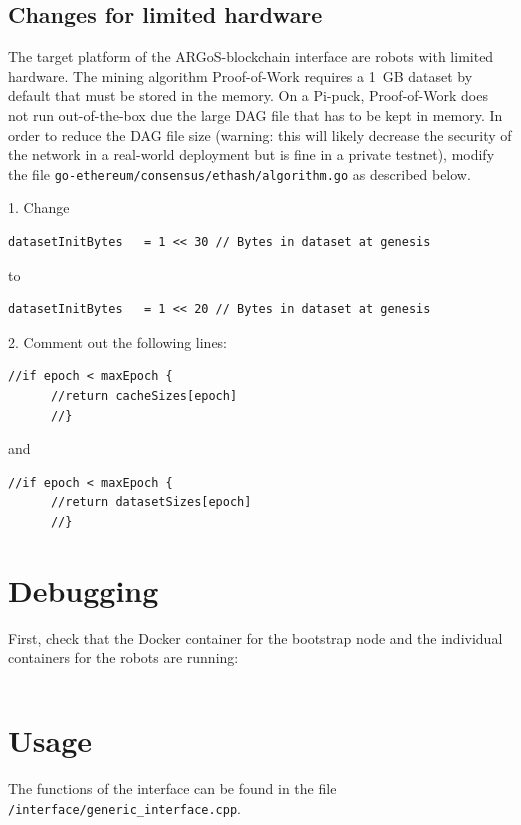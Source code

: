 \documentclass{article}
\begin{document}
\subsection{Changes for limited hardware}
\label{sec:limited-hardware}

The target platform of the ARGoS-blockchain interface are robots with
limited hardware. The mining algorithm Proof-of-Work requires a 1~GB
dataset by default that must be stored in the memory. On a Pi-puck,
Proof-of-Work does not run out-of-the-box due the large DAG file that
has to be kept in memory. In order to reduce the DAG file size
(warning: this will likely decrease the security of the network in a
real-world deployment but is fine in a private testnet), modify the
file \verb|go-ethereum/consensus/ethash/algorithm.go| as described below.

1. Change
\begin{verbatim}
datasetInitBytes   = 1 << 30 // Bytes in dataset at genesis
\end{verbatim}
to
\begin{verbatim}
datasetInitBytes   = 1 << 20 // Bytes in dataset at genesis
\end{verbatim}
2. Comment out the following lines:
\begin{verbatim}
//if epoch < maxEpoch {
	  //return cacheSizes[epoch]
	  //}
\end{verbatim}
        and        
\begin{verbatim}
//if epoch < maxEpoch {
	  //return datasetSizes[epoch]
	  //}
\end{verbatim}


\section{Debugging}

First, check that the Docker container for the bootstrap node and the
individual containers for the robots are running:

\begin{verbatim}

\end{verbatim}


\section{Usage}

The functions of the interface can be found in the file
\verb|/interface/generic_interface.cpp|.
\end{document}
